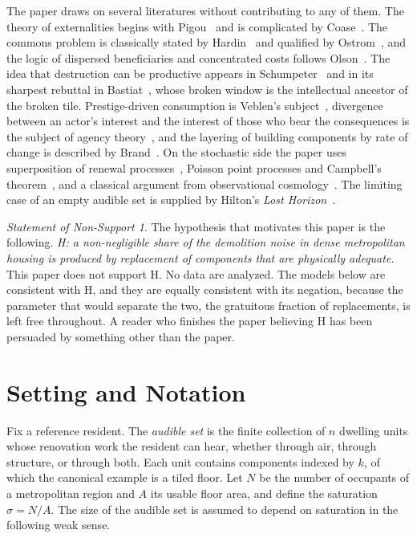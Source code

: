 \documentclass[11pt]{article}
\theoremstyle{definition}
\theoremstyle{remark}
\newtheorem{nonsupport}{Statement of Non-Support}
\begin{document}
The paper draws on several literatures without contributing to any of them. The theory of externalities begins with Pigou~\cite{pigou} and is complicated by Coase~\cite{coase}. The commons problem is classically stated by Hardin~\cite{hardin} and qualified by Ostrom~\cite{ostrom}, and the logic of dispersed beneficiaries and concentrated costs follows Olson~\cite{olson}. The idea that destruction can be productive appears in Schumpeter~\cite{schumpeter} and in its sharpest rebuttal in Bastiat~\cite{bastiat}, whose broken window is the intellectual ancestor of the broken tile. Prestige-driven consumption is Veblen's subject~\cite{veblen}, divergence between an actor's interest and the interest of those who bear the consequences is the subject of agency theory~\cite{jensen}, and the layering of building components by rate of change is described by Brand~\cite{brand}. On the stochastic side the paper uses superposition of renewal processes~\cite{cox,khinchin}, Poisson point processes and Campbell's theorem~\cite{campbell,kingman}, and a classical argument from observational cosmology~\cite{harrison}. The limiting case of an empty audible set is supplied by Hilton's \emph{Lost Horizon}~\cite{hilton}.

\begin{nonsupport}\label{ns:intro}
The hypothesis that motivates this paper is the following. \emph{H: a non-negligible share of the demolition noise in dense metropolitan housing is produced by replacement of components that are physically adequate.} This paper does not support H. No data are analyzed. The models below are consistent with H, and they are equally consistent with its negation, because the parameter that would separate the two, the gratuitous fraction of replacements, is left free throughout. A reader who finishes the paper believing H has been persuaded by something other than the paper.
\end{nonsupport}

\section{Setting and Notation}\label{sec:setting}

Fix a reference resident. The \emph{audible set} is the finite collection of $n$ dwelling units whose renovation work the resident can hear, whether through air, through structure, or through both. Each unit contains components indexed by $k$, of which the canonical example is a tiled floor. Let $N$ be the number of occupants of a metropolitan region and $A$ its usable floor area, and define the saturation $\sigma = N/A$. The size of the audible set is assumed to depend on saturation in the following weak sense.
\end{document}
